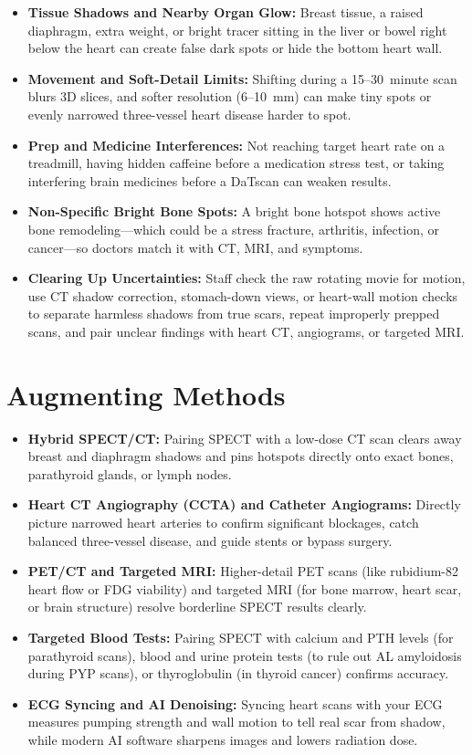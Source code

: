 \begin{itemize}
    \item \textbf{Tissue Shadows and Nearby Organ Glow:} Breast tissue, a raised diaphragm, extra weight, or bright tracer sitting in the liver or bowel right below the heart can create false dark spots or hide the bottom heart wall.
    \item \textbf{Movement and Soft-Detail Limits:} Shifting during a 15--30~minute scan blurs 3D slices, and softer resolution (6--10~mm) can make tiny spots or evenly narrowed three-vessel heart disease harder to spot.
    \item \textbf{Prep and Medicine Interferences:} Not reaching target heart rate on a treadmill, having hidden caffeine before a medication stress test, or taking interfering brain medicines before a DaTscan can weaken results.
    \item \textbf{Non-Specific Bright Bone Spots:} A bright bone hotspot shows active bone remodeling---which could be a stress fracture, arthritis, infection, or cancer---so doctors match it with CT, MRI, and symptoms.
    \item \textbf{Clearing Up Uncertainties:} Staff check the raw rotating movie for motion, use CT shadow correction, stomach-down views, or heart-wall motion checks to separate harmless shadows from true scars, repeat improperly prepped scans, and pair unclear findings with heart CT, angiograms, or targeted MRI.
\end{itemize}

\section{Augmenting Methods}

\begin{itemize}
    \item \textbf{Hybrid SPECT/CT:} Pairing SPECT with a low-dose CT scan clears away breast and diaphragm shadows and pins hotspots directly onto exact bones, parathyroid glands, or lymph nodes.
    \item \textbf{Heart CT Angiography (CCTA) and Catheter Angiograms:} Directly picture narrowed heart arteries to confirm significant blockages, catch balanced three-vessel disease, and guide stents or bypass surgery.
    \item \textbf{PET/CT and Targeted MRI:} Higher-detail PET scans (like rubidium-82 heart flow or FDG viability) and targeted MRI (for bone marrow, heart scar, or brain structure) resolve borderline SPECT results clearly.
    \item \textbf{Targeted Blood Tests:} Pairing SPECT with calcium and PTH levels (for parathyroid scans), blood and urine protein tests (to rule out AL amyloidosis during PYP scans), or thyroglobulin (in thyroid cancer) confirms accuracy.
    \item \textbf{ECG Syncing and AI Denoising:} Syncing heart scans with your ECG measures pumping strength and wall motion to tell real scar from shadow, while modern AI software sharpens images and lowers radiation dose.
\end{itemize}

